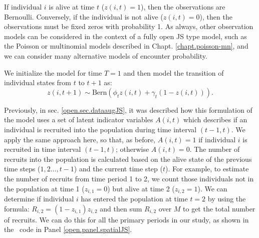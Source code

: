 If individual $i$ is alive at time $t$ ($z(i,t)=1$), then the
observations are Bernoulli.  Conversely, if the individual is
not alive ($z(i,t)=0$), then the observations must be fixed zeros with
probability 1.  As always, other observation models can be considered in
the context of a fully open JS type model, such as the
Poisson or multinomial models described
in Chapt. \ref{chapt.poisson-mn}, and we can consider many alternative
models of encounter probability.

We initialize the
model for time $T=1$
and then model the transition of individual states from
$t$ to $t+1$ as:
\[
 z(i,t+1) \sim \mbox{Bern}( \phi_t z(i,t)  + \gamma_t (1-z(i,t)) ).
\]

Previously, in sec. \ref{open.sec.dataaugJS}, it was described how this formulation of the model uses a set
of latent indicator variables $A(i,t)$ which describes if an individual
is recruited into the population during time interval $(t-1, t)$.  We apply the same approach here, so that, as before,
$A(i,t) = 1$ if individual $i$ is recruited in time interval $(t-1,
t)$; otherwise $A(i,t)=0$.  
The number of recruits into the
population is calculated based on the alive state of the previous time steps ($1, 2 \dots, t-1$) and the current time
step ($t$).
For example, to estimate the number of recruits from time period 1 to 2, we count those
individuals not in the population at time 1 ($z_{i,1} = 0$) but alive at time 2 ($z_{i,2} = 1$).
We can determine if individual $i$ has entered the population at time $t=2$ by using the formula:
 $R_{i,2}=(1-z_{i,1})z_{i,2}$ and then sum
$R_{i,2}$ over $M$ to get the total number of recruits.
We can do this for all the primary periods in our study,
as shown
in the \jags~code in Panel \ref{open.panel.spatialJS}.


